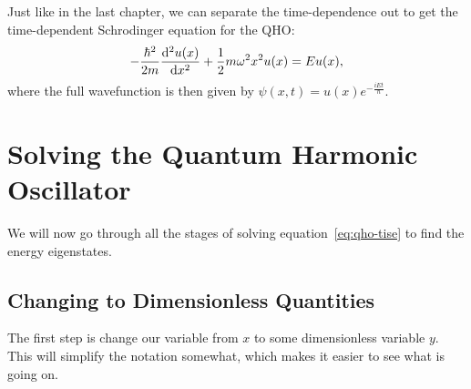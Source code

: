\documentclass[../quantum_mechanics.tex]{subfiles}
\begin{document}
            Just like in the last chapter, we can separate the time-dependence out to get the time-dependent Schrodinger equation for the QHO:
            \begin{equation}\label{eq:qho-tise}
                -\frac{\hbar^2}{2m}\dv[2]{u(x)}{x}+\frac{1}{2}m\omega^2x^2u(x)=Eu(x),
            \end{equation}
            where the full wavefunction is then given by $\psi(x,t)=u(x)e^{-\frac{iEt}{\hbar}}$.

    \section{Solving the Quantum Harmonic Oscillator}\label{sec:solving-the-quantum-harmonic-oscillator}
        We will now go through all the stages of solving equation~\ref{eq:qho-tise} to find the energy eigenstates.
        
        \subsection{Changing to Dimensionless Quantities}\label{sec:solving-the-quantum-harmonic-oscillator:subsec:changing-to-dimensionless-quantities}
            The first step is change our variable from $x$ to some dimensionless variable $y$.
            This will simplify the notation somewhat, which makes it easier to see what is going on.
\end{document}
